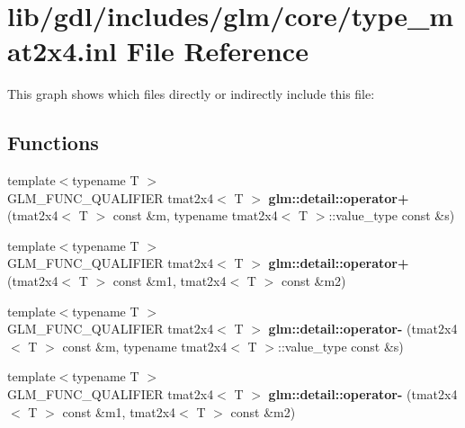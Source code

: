 \hypertarget{type__mat2x4_8inl}{}\section{lib/gdl/includes/glm/core/type\+\_\+mat2x4.inl File Reference}
\label{type__mat2x4_8inl}
This graph shows which files directly or indirectly include this file\+:
\subsection*{Functions}
\begin{DoxyCompactItemize}
\item 
\hypertarget{namespaceglm_1_1detail_ac5aeeee3f6ba464d32ea8c260c85ef87}{}{\footnotesize template$<$typename T $>$ }\\G\+L\+M\+\_\+\+F\+U\+N\+C\+\_\+\+Q\+U\+A\+L\+I\+F\+I\+E\+R tmat2x4$<$ T $>$ {\bfseries glm\+::detail\+::operator+} (tmat2x4$<$ T $>$ const \&m, typename tmat2x4$<$ T $>$\+::value\+\_\+type const \&s)\label{namespaceglm_1_1detail_ac5aeeee3f6ba464d32ea8c260c85ef87}

\item 
\hypertarget{namespaceglm_1_1detail_a25a5f14cc6791e18cfd894073be275a0}{}{\footnotesize template$<$typename T $>$ }\\G\+L\+M\+\_\+\+F\+U\+N\+C\+\_\+\+Q\+U\+A\+L\+I\+F\+I\+E\+R tmat2x4$<$ T $>$ {\bfseries glm\+::detail\+::operator+} (tmat2x4$<$ T $>$ const \&m1, tmat2x4$<$ T $>$ const \&m2)\label{namespaceglm_1_1detail_a25a5f14cc6791e18cfd894073be275a0}

\item 
\hypertarget{namespaceglm_1_1detail_a80391a343f26bf8efd1a7df9947870b6}{}{\footnotesize template$<$typename T $>$ }\\G\+L\+M\+\_\+\+F\+U\+N\+C\+\_\+\+Q\+U\+A\+L\+I\+F\+I\+E\+R tmat2x4$<$ T $>$ {\bfseries glm\+::detail\+::operator-\/} (tmat2x4$<$ T $>$ const \&m, typename tmat2x4$<$ T $>$\+::value\+\_\+type const \&s)\label{namespaceglm_1_1detail_a80391a343f26bf8efd1a7df9947870b6}

\item 
\hypertarget{namespaceglm_1_1detail_ac826b092d67f6b9cfc34f424c3f5a4d4}{}{\footnotesize template$<$typename T $>$ }\\G\+L\+M\+\_\+\+F\+U\+N\+C\+\_\+\+Q\+U\+A\+L\+I\+F\+I\+E\+R tmat2x4$<$ T $>$ {\bfseries glm\+::detail\+::operator-\/} (tmat2x4$<$ T $>$ const \&m1, tmat2x4$<$ T $>$ const \&m2)\label{namespaceglm_1_1detail_ac826b092d67f6b9cfc34f424c3f5a4d4}


\end{DoxyCompactItemize}

